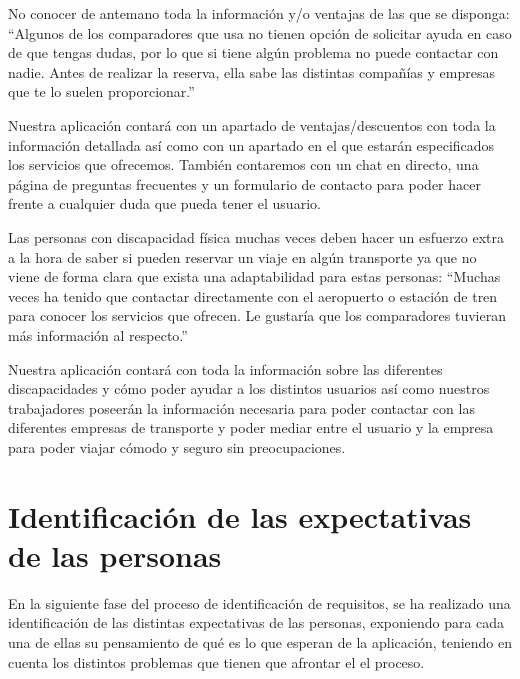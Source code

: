     \begin{problema}

    No conocer de antemano toda la información y/o ventajas de las que se disponga: ``Algunos de los comparadores que usa no tienen opción de solicitar ayuda en caso de que tengas dudas, por lo que si tiene algún problema no puede contactar con nadie. Antes de realizar la reserva, ella sabe las distintas compañías y empresas que te lo suelen proporcionar.''

    {\centering\begin{vision}
    Nuestra aplicación contará con un apartado de ventajas/descuentos con toda la información detallada así como con un apartado en el que estarán especificados los servicios que ofrecemos. También contaremos con un chat en directo, una página de preguntas frecuentes y un formulario de contacto para poder hacer frente a cualquier duda que pueda tener el usuario.
    \end{vision}}
    \end{problema}
    
    \begin{problema}

    Las personas con discapacidad física muchas veces deben hacer un esfuerzo extra a la hora de saber si pueden reservar un viaje en algún transporte ya que no viene de forma clara que exista una adaptabilidad para estas personas: ``Muchas veces ha tenido que contactar directamente con el aeropuerto o estación de tren para conocer los servicios que ofrecen. Le gustaría que los comparadores tuvieran más información al respecto.''

    {\centering\begin{vision}
    Nuestra aplicación contará con toda la información sobre las diferentes discapacidades y cómo poder ayudar a los distintos usuarios así como nuestros trabajadores poseerán la información necesaria para poder contactar con las diferentes empresas de transporte y poder mediar entre el usuario y la empresa para poder viajar cómodo y seguro sin preocupaciones.
    \end{vision}}
\end{problema}

\section{Identificación de las expectativas de las personas}
En la siguiente fase del proceso de identificación  de requisitos, se ha realizado una identificación de las distintas expectativas de las personas, exponiendo para cada una 
de ellas su pensamiento de qué es lo que esperan de la aplicación, teniendo en cuenta los distintos problemas que tienen que afrontar el el proceso.

